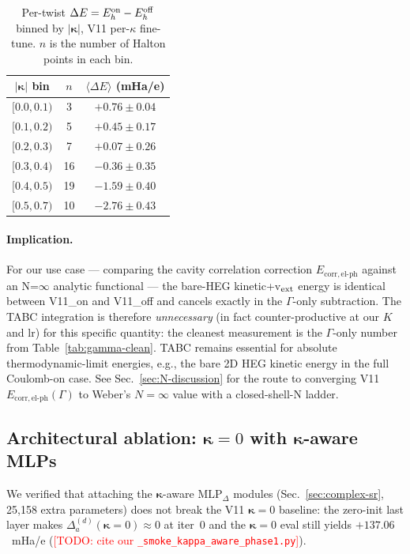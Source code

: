\documentclass[reprint,amsmath,amssymb,aps,prb,floatfix,nofootinbib]{revtex4-2}
\newcommand{\todo}[1]{\textcolor{red}{[TODO: #1]}}
\newcommand{\Ehp}{E_{\mathrm{corr},\mathrm{el}\text{-}\mathrm{ph}}}
\begin{document}
\begin{table}
\caption{Per-twist $\Delta E = E^{\rm on}_h - E^{\rm off}_h$ binned by
         $|\bm\kappa|$, V11 per-$\kappa$ fine-tune.  $n$ is the number
         of Halton points in each bin.}
\label{tab:de-bins}
\begin{ruledtabular}
\begin{tabular}{c|c|c}
$|\bm\kappa|$ bin & $n$ & $\langle\Delta E\rangle$ (mHa/e) \\
\hline
$[0.0, 0.1)$ & 3  & $+0.76 \pm 0.04$ \\
$[0.1, 0.2)$ & 5  & $+0.45 \pm 0.17$ \\
$[0.2, 0.3)$ & 7  & $+0.07 \pm 0.26$ \\
$[0.3, 0.4)$ & 16 & $-0.36 \pm 0.35$ \\
$[0.4, 0.5)$ & 19 & $-1.59 \pm 0.40$ \\
$[0.5, 0.7)$ & 10 & $-2.76 \pm 0.43$ \\
\end{tabular}
\end{ruledtabular}
\end{table}

\paragraph{Implication.}
For our use case --- comparing the cavity correlation correction
$\Ehp$ against an N=$\infty$ analytic functional --- the bare-HEG
kinetic+v$_{\rm ext}$ energy is identical between V11\_on and
V11\_off and cancels exactly in the $\Gamma$-only subtraction.  The
TABC integration is therefore \emph{unnecessary} (in fact
counter-productive at our $K$ and $\mathrm{lr}$) for this specific
quantity: the cleanest measurement is the $\Gamma$-only number from
Table~\ref{tab:gamma-clean}.  TABC remains essential for absolute
thermodynamic-limit energies, e.g., the bare 2D HEG kinetic energy
in the full Coulomb-on case.  See Sec.~\ref{sec:N-discussion} for
the route to converging V11 $\Ehp(\Gamma)$ to Weber's
$N{=}\infty$ value with a closed-shell-N ladder.

\subsection{Architectural ablation: $\bm\kappa = 0$ with $\bm\kappa$-aware MLPs}
\label{sec:results-kappa-aware}
We verified that attaching the $\bm\kappa$-aware
$\mathrm{MLP}_\Delta$ modules (Sec.~\ref{sec:complex-sr}, 25{,}158
extra parameters) does not break the V11 $\bm\kappa = 0$ baseline:
the zero-init last layer makes
$\Delta_a^{(d)}(\bm\kappa{=}0) \approx 0$ at iter~0 and the
$\bm\kappa = 0$ eval still yields $+137.06$~mHa/e
(\todo{cite our \texttt{\_smoke\_kappa\_aware\_phase1.py}}).
\end{document}
